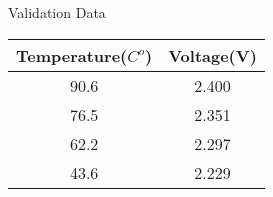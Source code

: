 \documentclass[journal,12pt,onecolumn]{IEEEtran}
\author{EE25BTECH11025\_EE25BTECH11023}
\begin{document}
\maketitle
\begin{center}
Validation Data\\
\vspace{0.3cm}
\begin{tabular}{|c|c|}
\hline
Temperature($C^o$)&Voltage(V)\\
\hline
90.6&2.400\\
\hline
76.5&2.351\\
\hline
62.2&2.297\\
\hline
43.6&2.229\\
\hline
\end{tabular}
\end{center}
\end{document}
